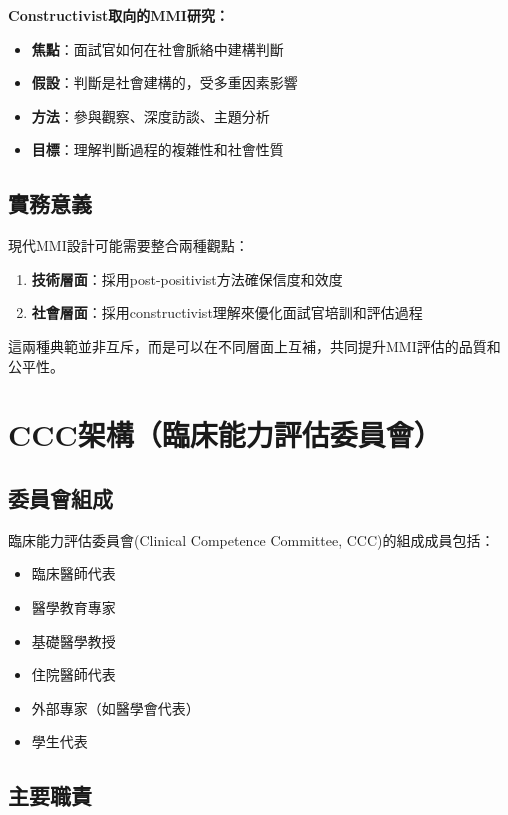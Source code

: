 \documentclass[12pt,a4paper]{article}
\begin{document}
\textbf{Constructivist取向的MMI研究：}
\begin{itemize}[nosep]
    \item \textbf{焦點}：面試官如何在社會脈絡中建構判斷
    \item \textbf{假設}：判斷是社會建構的，受多重因素影響
    \item \textbf{方法}：參與觀察、深度訪談、主題分析
    \item \textbf{目標}：理解判斷過程的複雜性和社會性質
\end{itemize}

\subsection{實務意義}

現代MMI設計可能需要整合兩種觀點：
\begin{enumerate}
    \item \textbf{技術層面}：採用post-positivist方法確保信度和效度
    \item \textbf{社會層面}：採用constructivist理解來優化面試官培訓和評估過程
\end{enumerate}

這兩種典範並非互斥，而是可以在不同層面上互補，共同提升MMI評估的品質和公平性。

\section{CCC架構（臨床能力評估委員會）}

\subsection{委員會組成}

臨床能力評估委員會(Clinical Competence Committee, CCC)的組成成員包括：
\begin{itemize}[nosep]
    \item 臨床醫師代表
    \item 醫學教育專家
    \item 基礎醫學教授
    \item 住院醫師代表
    \item 外部專家（如醫學會代表）
    \item 學生代表
\end{itemize}

\subsection{主要職責}
\end{document}
